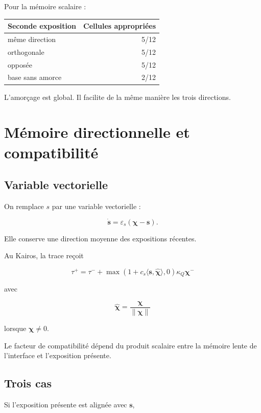 Pour la mémoire scalaire :

\begin{longtable}[]{@{}lr@{}}
\toprule\noalign{}
Seconde exposition & Cellules appropriées \\
\midrule\noalign{}
\endhead
\bottomrule\noalign{}
\endlastfoot
même direction & 5/12 \\
orthogonale & 5/12 \\
opposée & 5/12 \\
base sans amorce & 2/12 \\
\end{longtable}

L'amorçage est global. Il facilite de la même manière les trois
directions.

\chapter{Mémoire directionnelle et compatibilité}\label{t2-memoire-directionnelle-et-compatibilite}

\section{Variable vectorielle}\label{t2-variable-vectorielle}

On remplace \(s\) par une variable vectorielle :

\[
\dot{\mathbf s}
=
\varepsilon_s(\boldsymbol\chi-\mathbf s).
\]

Elle conserve une direction moyenne des expositions récentes.

Au Kairos, la trace reçoit

\[
\boxed{
\tau^+
=
\tau^-
+
\max\!\left(
1+c_s\langle\mathbf s,\widehat{\boldsymbol\chi}\rangle,
0
\right)
\kappa_Q\boldsymbol\chi^-
}
\]

avec

\[
\widehat{\boldsymbol\chi}
=
\frac{\boldsymbol\chi}
{\|\boldsymbol\chi\|}
\]

lorsque \(\boldsymbol\chi\neq0\).

Le facteur de compatibilité dépend du produit scalaire entre la mémoire
lente de l'interface et l'exposition présente.

\section{Trois cas}\label{t2-trois-cas}

Si l'exposition présente est alignée avec \(\mathbf s\),

